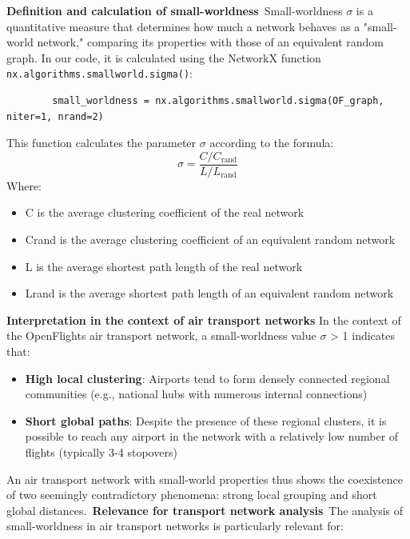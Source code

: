 \documentclass[12pt]{article}
\begin{document}
    \textbf{Definition and calculation of small-worldness}\
        Small-worldness $\sigma$ is a quantitative measure that determines how much a network behaves as a "small-world network," comparing its properties with those of an equivalent random graph. In our code, it is calculated using the NetworkX function \texttt{nx.algorithms.smallworld.sigma()}:
        \begin{verbatim}
        small_worldness = nx.algorithms.smallworld.sigma(OF_graph, niter=1, nrand=2)
        \end{verbatim}
        This function calculates the parameter $\sigma$ according to the formula:
        \begin{equation}
            \sigma = \frac{C/C_{\text{rand}}}{L/L_{\text{rand}}}
        \end{equation}
        Where:
        \begin{itemize}
        \item C is the average clustering coefficient of the real network
        \item C{rand} is the average clustering coefficient of an equivalent random network
        \item L is the average shortest path length of the real network
        \item L{rand} is the average shortest path length of an equivalent random network
        \end{itemize}
        \textbf{Interpretation in the context of air transport networks}
        In the context of the OpenFlights air transport network, a small-worldness value $\sigma$ > 1 indicates that:
        \begin{itemize}
        \item \textbf{High local clustering}: Airports tend to form densely connected regional communities (e.g., national hubs with numerous internal connections)
        \item \textbf{Short global paths}: Despite the presence of these regional clusters, it is possible to reach any airport in the network with a relatively low number of flights (typically 3-4 stopovers)
        \end{itemize}
        An air transport network with small-world properties thus shows the coexistence of two seemingly contradictory phenomena: strong local grouping and short global distances.\
        \textbf{Relevance for transport network analysis}\
        The analysis of small-worldness in air transport networks is particularly relevant for:
\end{document}
